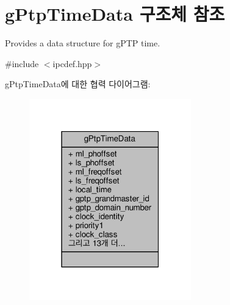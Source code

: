 \hypertarget{structg_ptp_time_data}{}\section{g\+Ptp\+Time\+Data 구조체 참조}
\label{structg_ptp_time_data}


Provides a data structure for g\+P\+TP time.  




{\ttfamily \#include $<$ipcdef.\+hpp$>$}



g\+Ptp\+Time\+Data에 대한 협력 다이어그램\+:
\nopagebreak
\begin{figure}[H]
\begin{center}
\leavevmode
\includegraphics[width=199pt]{structg_ptp_time_data__coll__graph}
\end{center}
\end{figure}
